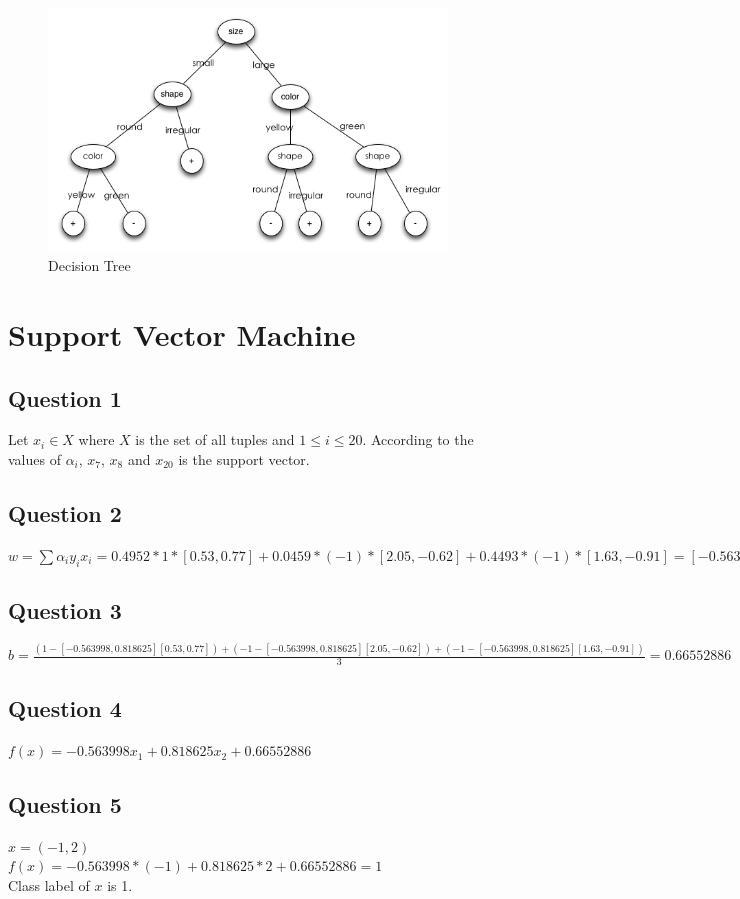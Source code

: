 \documentclass[11pt]{article} %
\begin{document}
\begin{figure}[htbp]
\begin{center}
\includegraphics[width=400px]{dt.png}
\caption{Decision Tree}
\label{default}
\end{center}
\end{figure}

\section{Support Vector Machine}
\subsection{Question 1}
Let $x_i \in X$ where $X$ is the set of all tuples and $1\leq i \leq 20$. According to the values of $\alpha_i$, $x_7$, $x_8$ and $x_{20}$ is the support vector.
\subsection{Question 2}
$w = \sum {\alpha_i  y_i  x_i} = 0.4952*1*[0.53,0.77] + 0.0459*(-1)*[2.05,-0.62]+0.4493*(-1)*[1.63,-0.91]=[-0.563998,0.818625]$
\subsection{Question 3}
$b =\frac{ (1-[-0.563998,0.818625][0.53,0.77])+(-1-[-0.563998,0.818625][2.05,-0.62])+(-1-[-0.563998,0.818625][1.63,-0.91])}{3}
=0.66552886$
\subsection{Question 4}
$f(x) = -0.563998x_1+0.818625x_2+0.66552886$
\subsection{Question 5}
$x=(-1,2)$\\
$f(x) = -0.563998*(-1)+0.818625*2+0.66552886=1$\\
Class label of $x$ is 1.
\end{document}
